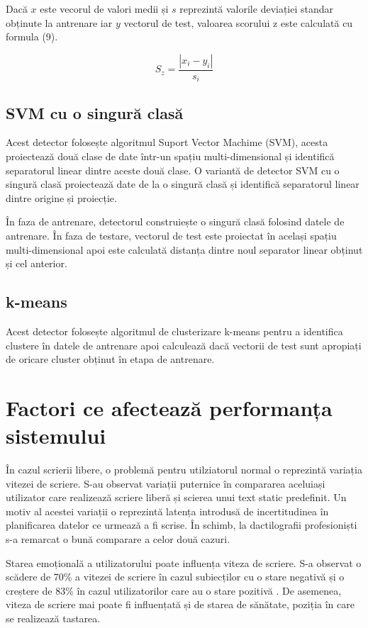 \documentclass[9pt,shortpaper,twoside,web]{ieeecolor}
\begin{document}
	Dacă $x$ este vecorul de valori medii și $s$ reprezintă valorile deviației standar obținute la antrenare iar $y$ vectorul de test, valoarea scorului z este calculată cu formula (9).
	
\begin{equation}  \label{eq9}
	S_z = \frac{|x_i - y_i|}{s_i}
\end{equation}

\subsection{SVM cu o singură clasă}
	Acest detector folosește algoritmul Suport Vector Machime (SVM), acesta proiectează două clase de date într-un spațiu multi-dimensional și identifică separatorul linear dintre aceste două clase. O variantă de detector SVM cu o singură clasă proiectează date de la o singură clasă și identifică separatorul linear dintre origine și proiecție.
	
	În faza de antrenare, detectorul construiește o singură clasă folosind datele de antrenare. În faza de testare, vectorul de test este proiectat în același spațiu multi-dimensional apoi este calculată  distanța dintre noul separator linear obținut și cel anterior.

\subsection{k-means}
	Acest detector folosește algoritmul de clusterizare k-means pentru a identifica clustere în datele de antrenare apoi calculează dacă vectorii de test sunt apropiați de oricare cluster obținut în etapa de antrenare. 

\section{Factori ce afectează performanța sistemului}
	În cazul scrierii libere, o problemă pentru utilziatorul normal o reprezintă variația vitezei de scriere. S-au observat variații puternice în compararea aceluiași utilizator care realizează scriere liberă și scierea unui text static predefinit. Un motiv al acestei variații o reprezintă latența introdusă de incertitudinea în planificarea datelor ce urmează a fi scrise. În schimb, la dactilografii profesioniști s-a remarcat o bună comparare a celor două cazuri\cite{b3}.
	
	Starea emoțională a utilizatorului poate influența viteza de scriere. S-a observat o scădere de 70\% a vitezei de scriere în cazul subiecților cu o stare negativă și o creștere de 83\% în cazul utilizatorilor care au o stare pozitivă \cite{b3}. De asemenea, viteza de scriere mai poate fi influențată și de starea de sănătate, poziția în care se realizează tastarea.
\end{document}
